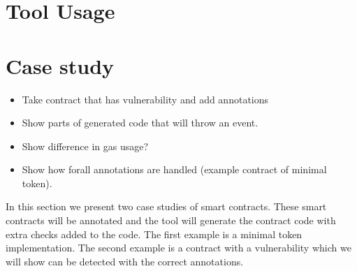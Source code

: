 \documentclass[a4paper]{article}
\begin{document}
\section{Tool Usage}


\section{Case study}
\begin{itemize}
  \item Take contract that has vulnerability and add annotations
  \item Show parts of generated code that will throw an event.
  \item Show difference in gas usage?
  \item Show how forall annotations are handled (example contract of minimal token).
\end{itemize}
In this section we present two case studies of smart contracts. These smart contracts will be annotated and the tool will generate the contract code with extra checks added to the code. The first example is a minimal token implementation. The second example is a contract with a vulnerability which we will show can be detected with the correct annotations.
\end{document}
